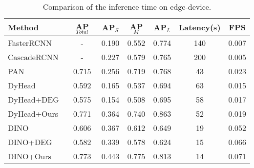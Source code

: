 \begin{table}[t]
\centering
\caption{Comparison of the inference time on edge-device.}
\vspace{-10pt}
	\setlength\tabcolsep{2.2pt}
   
\begin{tabular}{l|cccccc}
\hline
Method                                  & AP$_{Total}$ & AP$_{S}$ & AP$_{M}$ & AP$_{L}$ & Latency(s) & FPS   \\ \hline
FasterRCNN~\cite{ren2015faster}         & -            & 0.190    & 0.552    & 0.774    & 140        & 0.007 \\
CascadeRCNN~\cite{cai2018cascade}        & -            & 0.227    & 0.579    & 0.765    & 200        & 0.005 \\
PAN~\cite{fan2022speed}                 & 0.715        & 0.256    & 0.719    & 0.768    & 43         & 0.023 \\ \hline
DyHead~\cite{dai2021dynamic}      & 0.592        & 0.165    & 0.537    & 0.694    & 63         & 0.015 \\
DyHead+DEG~\cite{song2021dynamic} & 0.575        & 0.154    & 0.508    & 0.695    & 58         & 0.017 \\
\rowcolor{LightGreen} 
DyHead+Ours                       & 0.771        & 0.364    & 0.740    & 0.863    & 52         & 0.019 \\ \hline
DINO~\cite{zhang2022dino}              & 0.606        & 0.367    & 0.612    & 0.649    & 19         & 0.052 \\
DINO+DEG~\cite{song2021dynamic}        & 0.582        & 0.339    & 0.578    & 0.624    & 15         & 0.066 \\
\rowcolor{LightBlue} 
DINO+Ours                               & 0.773        & 0.443    & 0.775    & 0.813    & 14         & 0.071 \\ \hline
\end{tabular}


\label{tab:fps}
\end{table}
